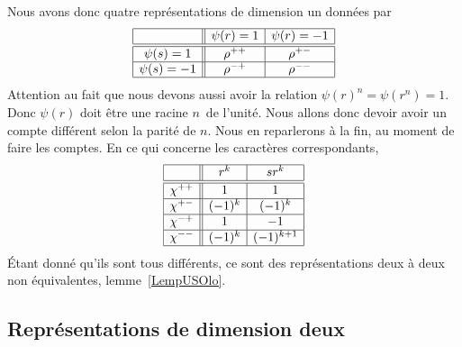 Nous avons donc quatre représentations de dimension un données par
\begin{equation*}
    \begin{array}[]{|c||c|c|}
        \hline
        &\psi(r)=1&\psi(r)=-1\\
        \hline\hline
        \psi(s)=1&\rho^{++}&\rho^{+-}\\
        \hline
        \psi(s)=-1&\rho^{-+}&\rho^{--}\\
        \hline
    \end{array}
\end{equation*}
Attention au fait que nous devons aussi avoir la relation \( \psi(r)^n=\psi(r^n)=1\). Donc \( \psi(r)\) doit être une racine \( n\)\ieme\ de l'unité. Nous allons donc devoir avoir un compte différent selon la parité de \( n\). Nous en reparlerons à la fin, au moment de faire les comptes. En ce qui concerne les caractères correspondants,
\begin{equation*}
    \begin{array}[]{|c||c|c|}
        \hline
        &r^k&sr^k\\
        \hline\hline
        \chi^{++}&1&1\\
        \hline
        \chi^{+-}&(-1)^k&(-1)^k\\
        \hline
        \chi^{-+}&1&-1\\
        \hline
        \chi^{--}&(-1)^k&(-1)^{k+1}\\
        \hline
    \end{array}
\end{equation*}
Étant donné qu'ils sont tous différents, ce sont des représentations deux à deux non équivalentes, lemme~\ref{LempUSOlo}.

\subsection{Représentations de dimension deux}

